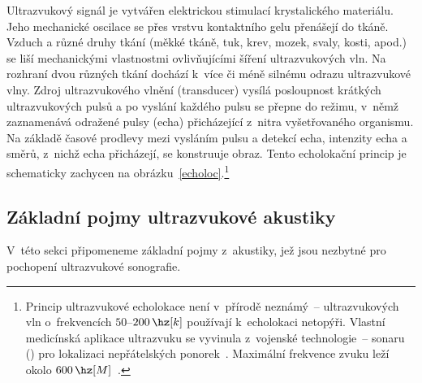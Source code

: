 Ultrazvukový signál je vytvářen elektrickou stimulací krystalického materiálu.
Jeho mechanické oscilace se přes vrstvu kontaktního gelu přenášejí do tkáně.
Vzduch a různé druhy tkání (měkké tkáně, tuk, krev, mozek, svaly, kosti,
apod.) se liší mechanickými vlastnostmi ovlivňujícími šíření ultrazvukových
vln. Na rozhraní dvou různých tkání dochází k~více či méně silnému odrazu
ultrazvukové vlny. Zdroj ultrazvukového vlnění (transducer) vysílá posloupnost
krátkých ultrazvukových pulsů a po vyslání každého pulsu se přepne do
 režimu, v~němž zaznamenává odražené pulsy (echa)
přicházející z~nitra vyšetřovaného organismu. Na základě časové prodlevy mezi
vysláním pulsu a detekcí echa, intenzity echa a směrů, z~nichž echa
přicházejí, se konstruuje obraz. Tento echolokační princip je schematicky
zachycen na obrázku~\ref{echoloc}.\footnote{Princip ultrazvukové echolokace
  není v~přírodě neznámý~-- ultrazvukových vln o~frekvencích
  $50$--$200\,\hz[k]$ používají k~echolokaci netopýři. Vlastní medicínská
  aplikace ultrazvuku se vyvinula z~vojenské technologie~-- sonaru () pro lokalizaci nepřátelských
  ponorek~\cite{Zaz:2007::NaziKost}. Maximální frekvence zvuku leží okolo
  $600\,\hz[M]$~\cite{Dow-Ken-Joh:2006:PhysDiagImag:}.}

\subsection{Základní pojmy ultrazvukové akustiky}\label{accoustic}%

V~této sekci připomeneme základní pojmy z~akustiky, jež jsou nezbytné pro
pochopení ultrazvukové sonografie.

